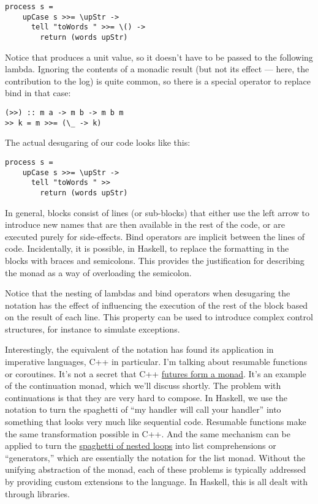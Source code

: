 \begin{Verbatim}
process s =
    upCase s >>= \upStr ->
      tell "toWords " >>= \() ->
        return (words upStr)
\end{Verbatim}
Notice that  produces a unit value, so it doesn't have to
be passed to the following lambda. Ignoring the contents of a monadic
result (but not its effect --- here, the contribution to the log) is
quite common, so there is a special operator to replace bind in that
case:

\begin{Verbatim}[commandchars=\\\{\}]
(>>) :: m a -> m b -> m b m
>> k = m >>= (\_ -> k)
\end{Verbatim}
The actual desugaring of our code looks like this:

\begin{Verbatim}
process s =
    upCase s >>= \upStr ->
      tell "toWords " >>
        return (words upStr)
\end{Verbatim}
In general,  blocks consist of lines (or sub-blocks) that
either use the left arrow to introduce new names that are then available
in the rest of the code, or are executed purely for side-effects. Bind
operators are implicit between the lines of code. Incidentally, it is
possible, in Haskell, to replace the formatting in the 
blocks with braces and semicolons. This provides the justification for
describing the monad as a way of overloading the semicolon.

Notice that the nesting of lambdas and bind operators when desugaring
the  notation has the effect of influencing the execution of
the rest of the  block based on the result of each line. This
property can be used to introduce complex control structures, for
instance to simulate exceptions.

Interestingly, the equivalent of the  notation has found its
application in imperative languages, C++ in particular. I'm talking
about resumable functions or coroutines. It's not a secret that C++
\href{https://bartoszmilewski.com/2014/02/26/c17-i-see-a-monad-in-your-future/}{futures
form a monad}. It's an example of the continuation monad, which we'll
discuss shortly. The problem with continuations is that they are very
hard to compose. In Haskell, we use the  notation to turn the
spaghetti of ``my handler will call your handler'' into something that
looks very much like sequential code. Resumable functions make the same
transformation possible in C++. And the same mechanism can be applied to
turn the
\href{https://bartoszmilewski.com/2014/04/21/getting-lazy-with-c/}{spaghetti
of nested loops} into list comprehensions or ``generators,'' which are
essentially the  notation for the list monad. Without the
unifying abstraction of the monad, each of these problems is typically
addressed by providing custom extensions to the language. In Haskell,
this is all dealt with through libraries.